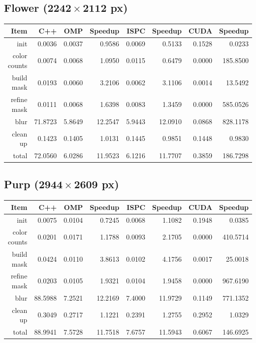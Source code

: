 \documentclass[12pt]{article}
\begin{document}
\subsection{Flower ($\mathbf{2242 \times 2112}$ px)}

\begin{tabular}{r|r|r|r|r|r|r|r}
    Item & C++ & OMP & Speedup & ISPC & Speedup & CUDA & Speedup
\\  \hline
    init & 0.0036 & 0.0037 & 0.9586 & 0.0069 & 0.5133 & 0.1528 & 0.0233
\\  color counts & 0.0074 & 0.0068 & 1.0950 & 0.0115 & 0.6479 & 0.0000 & 185.8500
\\  build mask & 0.0193 & 0.0060 & 3.2106 & 0.0062 & 3.1106 & 0.0014 & 13.5492
\\  refine mask & 0.0111 & 0.0068 & 1.6398 & 0.0083 & 1.3459 & 0.0000 & 585.0526
\\  blur & 71.8723 & 5.8649 & 12.2547 & 5.9443 & 12.0910 & 0.0868 & 828.1178
\\  clean up & 0.1423 & 0.1405 & 1.0131 & 0.1445 & 0.9851 & 0.1448 & 0.9830
\\  \hline
    total & 72.0560 & 6.0286 & 11.9523 & 6.1216 & 11.7707 & 0.3859 & 186.7298
\end{tabular}

\subsection{Purp ($\mathbf{2944 \times 2609}$ px)}

\begin{tabular}{r|r|r|r|r|r|r|r}
    Item & C++ & OMP & Speedup & ISPC & Speedup & CUDA & Speedup
\\  \hline
    init & 0.0075 & 0.0104 & 0.7245 & 0.0068 & 1.1082 & 0.1948 & 0.0385
\\  color counts & 0.0201 & 0.0171 & 1.1788 & 0.0093 & 2.1705 & 0.0000 & 410.5714
\\  build mask & 0.0424 & 0.0110 & 3.8613 & 0.0102 & 4.1756 & 0.0017 & 25.0018
\\  refine mask & 0.0203 & 0.0105 & 1.9321 & 0.0104 & 1.9458 & 0.0000 & 967.6190
\\  blur & 88.5988 & 7.2521 & 12.2169 & 7.4000 & 11.9729 & 0.1149 & 771.1352
\\  clean up & 0.3049 & 0.2717 & 1.1221 & 0.2391 & 1.2755 & 0.2952 & 1.0329
\\  \hline
    total & 88.9941 & 7.5728 & 11.7518 & 7.6757 & 11.5943 & 0.6067 & 146.6925
\end{tabular}
\end{document}
